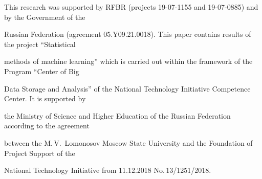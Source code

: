 












\vspace*{-22pt}





\Ack





\vspace*{-4pt}


\noindent


 This research was supported by RFBR (projects 19-07-1155 and 19-07-0885) and by  the Government of the 


Russian Federation (agreement 05.Y09.21.0018). This paper contains results of the project ``Statistical 


methods of machine learning'' which is carried out within the framework of the Program ``Center of Big 


Data Storage and Analysis'' of the National Technology Initiative Competence Center. It is supported by 


the Ministry of Science and Higher Education of the Russian Federation according to the agreement 


between the M.\,V.~Lomonosov Moscow State University and the Foundation of Project Support of the 


National Technology Initiative from 11.12.2018 No.\,13/1251/2018.










